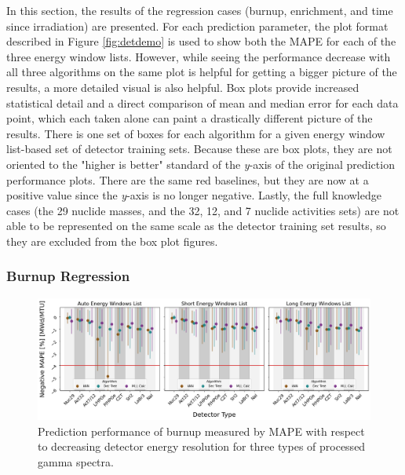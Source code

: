 
In this section, the results of the regression cases (burnup, enrichment, and
time since irradiation) are presented. For each prediction parameter, the plot
format described in Figure \ref{fig:detdemo} is used to show both the
\gls{MAPE} for each of the three energy window lists.  However, while seeing
the performance decrease with all three algorithms on the same plot is helpful
for getting a bigger picture of the results, a more detailed visual is also
helpful. Box plots provide increased statistical detail and a direct comparison
of mean and median error for each data point, which each taken alone can paint
a drastically different picture of the results.  There is one set of boxes for
each algorithm for a given energy window list-based set of detector training
sets.  Because these are box plots, they are not oriented to the "higher is
better" standard of the \textit{y}-axis of the original prediction performance
plots.  There are the same red baselines, but they are now at a positive value
since the \textit{y}-axis is no longer negative.  Lastly, the full knowledge
cases (the 29 nuclide masses, and the 32, 12, and 7 nuclide activities sets)
are not able to be represented on the same scale as the detector training set
results, so they are excluded from the box plot figures. 

\subsubsection{Burnup Regression}

\begin{figure}[!htb]
  \centering
  \includegraphics[width=\textwidth]{./chapters/exp2/detector_preds_wrt_enlist_MAPE_burn.png}
  \caption{Prediction performance of burnup measured by \gls{MAPE} with 
           respect to decreasing detector energy resolution for three types 
           of processed gamma spectra.}
  \label{fig:burn}
\end{figure}

